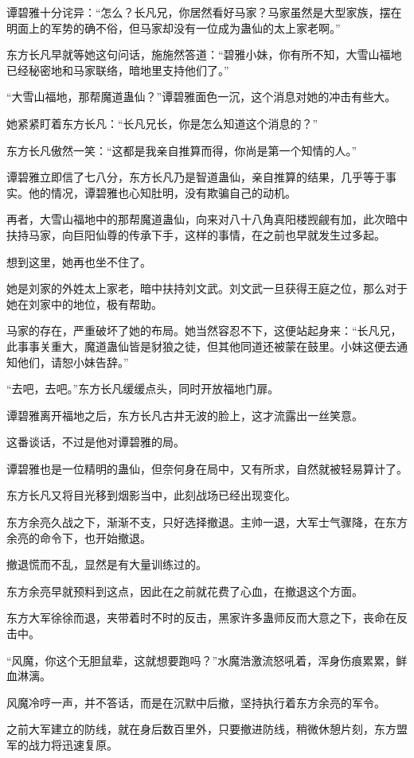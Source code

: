 \begin{this_body}
谭碧雅十分诧异：“怎么？长凡兄，你居然看好马家？马家虽然是大型家族，摆在明面上的军势的确不俗，但马家却没有一位成为蛊仙的太上家老啊。”

东方长凡早就等她这句问话，施施然答道：“碧雅小妹，你有所不知，大雪山福地已经秘密地和马家联络，暗地里支持他们了。”

“大雪山福地，那帮魔道蛊仙？”谭碧雅面色一沉，这个消息对她的冲击有些大。

她紧紧盯着东方长凡：“长凡兄长，你是怎么知道这个消息的？”

东方长凡傲然一笑：“这都是我亲自推算而得，你尚是第一个知情的人。”

谭碧雅立即信了七八分，东方长凡乃是智道蛊仙，亲自推算的结果，几乎等于事实。他的情况，谭碧雅也心知肚明，没有欺骗自己的动机。

再者，大雪山福地中的那帮魔道蛊仙，向来对八十八角真阳楼觊觎有加，此次暗中扶持马家，向巨阳仙尊的传承下手，这样的事情，在之前也早就发生过多起。

想到这里，她再也坐不住了。

她是刘家的外姓太上家老，暗中扶持刘文武。刘文武一旦获得王庭之位，那么对于她在刘家中的地位，极有帮助。

马家的存在，严重破坏了她的布局。她当然容忍不下，这便站起身来：“长凡兄，此事事关重大，魔道蛊仙皆是豺狼之徒，但其他同道还被蒙在鼓里。小妹这便去通知他们，请恕小妹告辞。”

“去吧，去吧。”东方长凡缓缓点头，同时开放福地门扉。

谭碧雅离开福地之后，东方长凡古井无波的脸上，这才流露出一丝笑意。

这番谈话，不过是他对谭碧雅的局。

谭碧雅也是一位精明的蛊仙，但奈何身在局中，又有所求，自然就被轻易算计了。

东方长凡又将目光移到烟影当中，此刻战场已经出现变化。

东方余亮久战之下，渐渐不支，只好选择撤退。主帅一退，大军士气骤降，在东方余亮的命令下，也开始撤退。

撤退慌而不乱，显然是有大量训练过的。

东方余亮早就预料到这点，因此在之前就花费了心血，在撤退这个方面。

东方大军徐徐而退，夹带着时不时的反击，黑家许多蛊师反而大意之下，丧命在反击中。

“风魔，你这个无胆鼠辈，这就想要跑吗？”水魔浩激流怒吼着，浑身伤痕累累，鲜血淋漓。

风魔冷哼一声，并不答话，而是在沉默中后撤，坚持执行着东方余亮的军令。

之前大军建立的防线，就在身后数百里外，只要撤进防线，稍微休憩片刻，东方盟军的战力将迅速复原。


\end{this_body}
